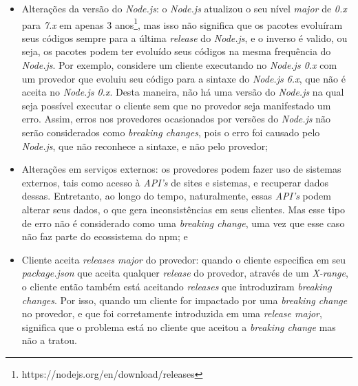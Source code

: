 \begin{itemize}
    \item Alterações da versão do \textit{Node.js}: o \textit{Node.js} atualizou o seu nível \textit{major} de \textit{0.x} para \textit{7.x} em apenas 3 anos\footnote{https://nodejs.org/en/download/releases}, mas isso não significa que os pacotes evoluíram seus códigos sempre para a última \textit{release} do \textit{Node.js}, e o inverso é valido, ou seja, os pacotes podem ter evoluído seus códigos na mesma frequência do \textit{Node.js}. Por exemplo, considere um cliente executando no \textit{Node.js 0.x} com um provedor que evoluiu seu código para a sintaxe do \textit{Node.js 6.x}, que não é aceita no \textit{Node.js 0.x}. Desta maneira, não há uma versão do \textit{Node.js}  na qual seja possível executar o cliente sem que no provedor seja manifestado um erro. Assim, erros nos provedores ocasionados por versões do \textit{Node.js} não serão considerados como \textit{breaking changes}, pois o erro foi causado pelo \textit{Node.js}, que não reconhece a sintaxe, e não pelo provedor;

    \item Alterações em serviços externos: os provedores podem fazer uso de sistemas externos, tais como acesso à \textit{API's} de sites e sistemas, e recuperar dados dessas. Entretanto, ao longo do tempo, naturalmente, essas \textit{API's} podem alterar seus dados, o que gera inconsistências em seus clientes. Mas esse tipo de erro não é considerado como uma \textit{breaking change}, uma vez que esse caso não faz parte do ecossistema do \gls{npm}; e
    \item Cliente aceita \textit{releases major} do provedor: quando o cliente especifica em seu \textit{package.json} que aceita qualquer \textit{release} do provedor, através de um \textit{X-range}, o cliente então também está aceitando \textit{releases} que introduziram \textit{breaking changes}. Por isso, quando um cliente for impactado por uma \textit{breaking change} no provedor, e que foi corretamente introduzida em uma \textit{release major}, significa que o problema está no cliente que aceitou a \textit{breaking change} mas não a tratou.
\end{itemize}{}

